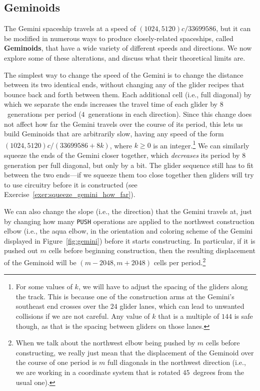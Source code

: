 \subsection{Geminoids}\label{sec:geminoids}

The Gemini spaceship travels at a speed of $(1024,5120)c/33699586$, but it can be modified in numerous ways to produce closely-related spaceships, called \textbf{Geminoids}, that have a wide variety of different speeds and directions. We now explore some of these alterations, and discuss what their theoretical limits are.

The simplest way to change the speed of the Gemini is to change the distance between its two identical ends, without changing any of the glider recipes that bounce back and forth between them. Each additional cell (i.e., full diagonal) by which we separate the ends increases the travel time of each glider by $8$~generations per period ($4$~generations in each direction). Since this change does not affect how far the Gemini travels over the course of its period, this lets us build Geminoids that are arbitrarily slow, having any speed of the form $(1024,5120)c/(33699586 + 8k)$, where $k \geq 0$ is an integer.\footnote{For some values of $k$, we will have to adjust the spacing of the gliders along the track. This is because one of the construction arms at the Gemini's southeast end crosses over the $24$ glider lanes, which can lead to unwanted collisions if we are not careful. Any value of $k$ that is a multiple of $144$ is safe though, as that is the spacing between gliders on those lanes.} We can similarly squeeze the ends of the Gemini closer together, which \emph{decreases} its period by $8$ generation per full diagonal, but only by a bit. The glider sequence still has to fit between the two ends---if we squeeze them too close together then gliders will try to use circuitry before it is constructed (see Exercise~\ref{exer:squeeze_gemini_how_far}).

We can also change the slope (i.e., the direction) that the Gemini travels at, just by changing how many \texttt{PUSH} operations are applied to the northwest construction elbow (i.e., the aqua elbow, in the orientation and coloring scheme of the Gemini displayed in Figure~\ref{fig:gemini}) before it starts constructing. In particular, if it is pushed out $m$ cells before beginning construction, then the resulting displacement of the Geminoid will be $(m-2048,m+2048)$ cells per period.\footnote{When we talk about the northwest elbow being pushed by $m$ cells before constructing, we really just mean that the displacement of the Geminoid over the course of one period is $m$ full diagonals in the northwest direction (i.e., we are working in a coordinate system that is rotated $45$~degrees from the usual one).}


